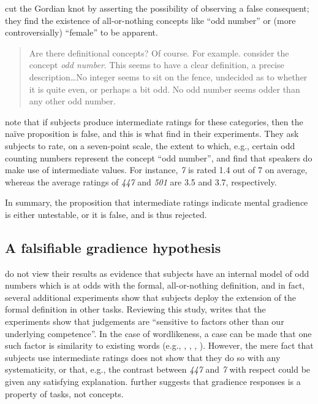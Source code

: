 \citet{Armstrong1983} cut the Gordian knot by asserting the possibility of observing a false consequent; they find the existence of all-or-nothing concepts like ``odd number'' or (more controversially) ``female'' to be apparent.

\begin{quote}
Are there definitional concepts? Of course. For example. consider the concept \emph{odd number}. This seems to have a clear definition, a precise description\ldots{}No integer seems to sit on the fence, undecided as to whether it is quite even, or perhaps a bit odd. No odd number seems odder than any other odd number. \citep[274]{Armstrong1983}
\end{quote}

\citeauthor{Armstrong1983} note that if subjects produce intermediate ratings for these categories, then the naïve proposition is false,
and this is what \citeauthor{Armstrong1983} find in their experiments. They ask subjects to rate, on a seven-point scale, the extent to which, e.g., certain odd counting numbers represent the concept ``odd number'', and find that speakers do make use of intermediate values. For instance, \emph{7} is rated 1.4 out of 7 on average, whereas the average ratings of \emph{447} and \emph{501} are 3.5 and 3.7, respectively. 

In summary, the proposition that intermediate ratings indicate mental gradience is either untestable, or it is false, and is thus rejected.

\subsection{A falsifiable gradience hypothesis}

\citeauthor{Armstrong1983} do not view their results as evidence that subjects have an internal model of odd numbers which is at odds with the formal, all-or-nothing definition, and in fact, several additional experiments show that subjects deploy the extension of the formal definition in other tasks. Reviewing this study, \citet[215]{Schutze2011} writes that the experiments show that judgements are ``sensitive to factors other than our underlying competence''. In the case of wordlikeness, a case can be made that one such factor is similarity to existing words (e.g., \citealt[][151, fn. 27]{LSLT}, \citealt{Greenberg1964}, \citealt{Ohala1986b}, \citealt{Bailey2001}). However, the mere fact that subjects use intermediate ratings does not show that they do so with any systematicity, or that, e.g., the contrast between \emph{447} and \emph{7} with respect could be given any satisfying explanation. \citeauthor{Schutze2011} further suggests that gradience responses is a property of tasks, not concepts.

